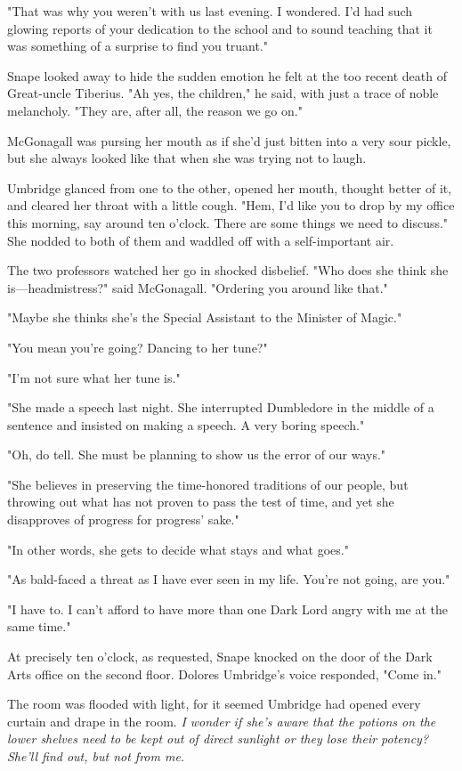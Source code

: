 "That was why you weren't with us last evening. I wondered. I'd had such glowing reports of your dedication to the school and to sound teaching that it was something of a surprise to find you truant."

Snape looked away to hide the sudden emotion he felt at the too recent death of Great-uncle Tiberius. "Ah yes, the children," he said, with just a trace of noble melancholy. "They are, after all, the reason we go on."

McGonagall was pursing her mouth as if she'd just bitten into a very sour pickle, but she always looked like that when she was trying not to laugh.

Umbridge glanced from one to the other, opened her mouth, thought better of it, and cleared her throat with a little cough. "Hem, I'd like you to drop by my office this morning, say around ten o'clock. There are some things we need to discuss." She nodded to both of them and waddled off with a self-important air.

The two professors watched her go in shocked disbelief. "Who does she think she is—headmistress?" said McGonagall. "Ordering you around like that."

"Maybe she thinks she's the Special Assistant to the Minister of Magic."

"You mean you're going? Dancing to her tune?"

"I'm not sure what her tune is."

"She made a speech last night. She interrupted Dumbledore in the middle of a sentence and insisted on making a speech. A very boring speech."

"Oh, do tell. She must be planning to show us the error of our ways."

"She believes in preserving the time-honored traditions of our people, but throwing out what has not proven to pass the test of time, and yet she disapproves of progress for progress' sake."

"In other words, she gets to decide what stays and what goes."

"As bald-faced a threat as I have ever seen in my life. You're not going, are you."

"I have to. I can't afford to have more than one Dark Lord angry with me at the same time."

At precisely ten o'clock, as requested, Snape knocked on the door of the Dark Arts office on the second floor. Dolores Umbridge's voice responded, "Come in."

The room was flooded with light, for it seemed Umbridge had opened every curtain and drape in the room. \emph{I wonder if she's aware that the potions on the lower shelves need to be kept out of direct sunlight or they lose their potency? She'll find out, but not from me.}

